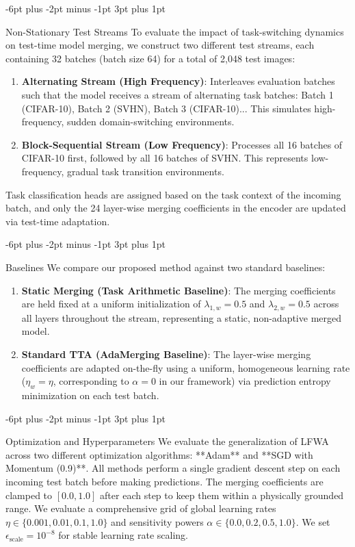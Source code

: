 \documentclass{article}
\makeatletter
\theoremstyle{plain}
\theoremstyle{definition}
\theoremstyle{remark}
\renewcommand{\subsection}{\@startsection{subsection}{2}{\z@}%
                          {-6pt plus -2pt minus -1pt}%
                          {3pt plus 1pt}%
                          {\normalfont\normalsize\bfseries\raggedright}}
\makeatother
\begin{document}
\subsection{Non-Stationary Test Streams}
To evaluate the impact of task-switching dynamics on test-time model merging, we construct two different test streams, each containing 32 batches (batch size 64) for a total of 2,048 test images:
\begin{enumerate}\setlength{\itemsep}{1pt}\setlength{\parskip}{0pt}\setlength{\parsep}{0pt}
    \item \textbf{Alternating Stream (High Frequency)}: Interleaves evaluation batches such that the model receives a stream of alternating task batches: Batch 1 (CIFAR-10), Batch 2 (SVHN), Batch 3 (CIFAR-10)... This simulates high-frequency, sudden domain-switching environments.
    \item \textbf{Block-Sequential Stream (Low Frequency)}: Processes all 16 batches of CIFAR-10 first, followed by all 16 batches of SVHN. This represents low-frequency, gradual task transition environments.
\end{enumerate}
Task classification heads are assigned based on the task context of the incoming batch, and only the 24 layer-wise merging coefficients in the encoder are updated via test-time adaptation.

\subsection{Baselines}
We compare our proposed method against two standard baselines:
\begin{enumerate}\setlength{\itemsep}{1pt}\setlength{\parskip}{0pt}\setlength{\parsep}{0pt}
    \item \textbf{Static Merging (Task Arithmetic Baseline)}: The merging coefficients are held fixed at a uniform initialization of $\lambda_{1, w} = 0.5$ and $\lambda_{2, w} = 0.5$ across all layers throughout the stream, representing a static, non-adaptive merged model.
    \item \textbf{Standard TTA (AdaMerging Baseline)}: The layer-wise merging coefficients are adapted on-the-fly using a uniform, homogeneous learning rate ($\eta_w = \eta$, corresponding to $\alpha = 0$ in our framework) via prediction entropy minimization on each test batch.
\end{enumerate}

\subsection{Optimization and Hyperparameters}
We evaluate the generalization of LFWA across two different optimization algorithms: **Adam** and **SGD with Momentum (0.9)**.
All methods perform a single gradient descent step on each incoming test batch before making predictions. The merging coefficients are clamped to $[0.0, 1.0]$ after each step to keep them within a physically grounded range. We evaluate a comprehensive grid of global learning rates $\eta \in \{0.001, 0.01, 0.1, 1.0\}$ and sensitivity powers $\alpha \in \{0.0, 0.2, 0.5, 1.0\}$. We set $\epsilon_{\text{scale}} = 10^{-8}$ for stable learning rate scaling.
\end{document}
